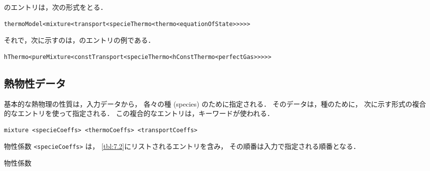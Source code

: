 のエントリは，次の形式をとる．
\begin{OFfile}
\begin{verbatim}
thermoModel<mixture<transport<specieThermo<thermo<equationOfState>>>>>
\end{verbatim}
\end{OFfile}
それで，次に示すのは，のエントリの例である．
\begin{OFfile}
\begin{verbatim}
hThermo<pureMixture<constTransport<specieThermo<hConstThermo<perfectGas>>>>>
\end{verbatim}
\end{OFfile}


\subsection{熱物性データ}
\label{ssec:7.1.1}
基本的な熱物理の性質は，入力データから，
各々の種 (species) のために指定される．
そのデータは，種のために，
次に示す形式の複合的なエントリを使って指定される．
この複合的なエントリは，キーワードが使われる．
\begin{OFfile}
\begin{verbatim}
mixture <specieCoeffs> <thermoCoeffs> <transportCoeffs>
\end{verbatim}
\end{OFfile}
物性係数 \verb|<specieCoeffs>| は，
\autoref{tbl:7.2}にリストされるエントリを含み，
その順番は入力で指定される順番となる．


\begin{table}[ht]
 
 \caption{物性係数}
 \label{tbl:7.2}
\end{table}


